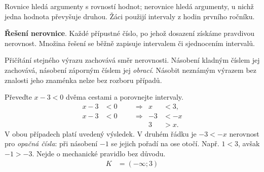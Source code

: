 \documentclass[11pt,a4paper]{article}
\begin{document}
Rovnice hledá argumenty s rovností hodnot; nerovnice hledá argumenty, u nichž jedna hodnota převyšuje druhou. Žáci použijí intervaly z hodin prvního ročníku.
\begin{definiceBox}[title={Definice - Řešení nerovnice}]
\textbf{Řešení nerovnice}. Každé přípustné číslo, po jehož dosazení získáme pravdivou nerovnost. Množina řešení se běžně zapisuje intervalem či sjednocením intervalů.
\end{definiceBox}
Přičítání stejného výrazu zachovává směr nerovnosti. Násobení kladným číslem jej zachovává, násobení záporným číslem jej \emph{obrací}. Násobit neznámým výrazem bez znalosti jeho znaménka nelze bez rozboru případů.
\begin{prikladReseniBox}[title={Příklad 1}]
Převeďte $x-3<0$ dvěma cestami a porovnejte intervaly.
\tcblower
\[
\begin{aligned}
x-3&<0 &\quad&\Rightarrow& x&<3,\\
x-3&<0 &\quad&\Rightarrow& -3&<-x\\
&&&& 3&>x.
\end{aligned}
\]
V obou případech platí uvedený výsledek. V druhém řádku je $-3<-x$ nerovnost pro \emph{opačná čísla}: při násobení $-1$ se jejich pořadí na ose otočí. Např. $1<3$, avšak $-1>-3$. Nejde o mechanické pravidlo bez důvodu.
\[
\begin{aligned}
K &= (-\infty;3)
\end{aligned}
\]
\end{prikladReseniBox}
\begin{center}
\end{center}
\end{document}

